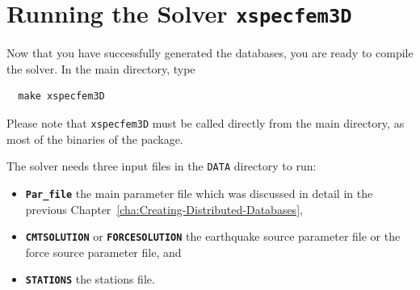 \chapter{Running the Solver \texttt{xspecfem3D}}\label{cha:Running-the-Solver}

Now that you have successfully generated the databases, you are ready
to compile the solver. In the main directory, type
{\small
\begin{verbatim}
  make xspecfem3D
\end{verbatim}
}
\noindent
Please note that \texttt{xspecfem3D} must be called directly from
the main directory, as most of the binaries of the package.\newline

\noindent
The solver needs three input files in the \texttt{DATA} directory
to run:
\begin{itemize}
\item {\bf \texttt{Par\_file}} the main parameter file which was discussed
in detail in the previous Chapter~\ref{cha:Creating-Distributed-Databases},
\item {\bf \texttt{CMTSOLUTION}} or {\bf \texttt{FORCESOLUTION}} the earthquake
source parameter file or the force source parameter file, and
\item {\bf \texttt{STATIONS}} the stations file.
\end{itemize}


